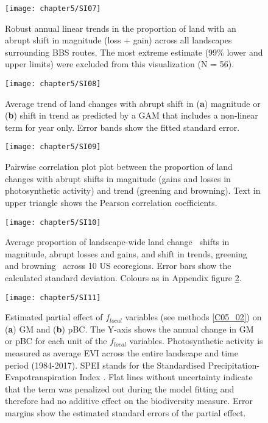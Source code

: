 \begin{figure}[htb]
\centering
\texttt{[image: chapter5/SI07]}
\caption{Robust annual linear trends in the proportion of land with an abrupt shift in magnitude (loss + gain) across all landscapes surrounding BBS routes. The most extreme estimate (99\% lower and upper limits) were excluded from this visualization (N = 56). }
\label{SI05_07}
\end{figure}

\begin{figure}[htb]
\centering
\texttt{[image: chapter5/SI08]}
\caption{Average trend of land changes with abrupt shift in (\textbf{a}) magnitude or (\textbf{b}) shift in trend as predicted by a GAM that includes a non-linear term for year only. Error bands show the fitted standard error.}
\label{SI05_08}
\end{figure}

\begin{figure}[htb]
\centering
\texttt{[image: chapter5/SI09]}
\caption{Pairwise correlation plot plot between the proportion of land changes with abrupt shifts in magnitude (gains and losses in photosynthetic activity) and trend (greening and browning). Text in upper triangle shows the Pearson correlation coefficients.}
\label{SI05_09}
\end{figure}

\begin{figure}[htb]
\centering
\texttt{[image: chapter5/SI10]}
\caption{Average proportion of landscape-wide land change \textendash\ shifts in magnitude, \eg abrupt losses and gains, and shift in trends, \eg greening and browning \textendash\ across 10 US ecoregions. Error bars show the calculated standard deviation. Colours as in Appendix figure \ref{SI05_08}.}
\label{SI05_10}
\end{figure}

\begin{figure}[htb]
\centering
\texttt{[image: chapter5/SI11]}
\caption{Estimated partial effect of $f_{local}$ variables (see methods \ref{C05_02}) on (\textbf{a}) GM and (\textbf{b}) pBC. The Y-axis shows the annual change in GM or pBC for each unit of the $f_{local}$ variables. Photosynthetic activity is measured as average EVI across the entire landscape and time period (1984-2017). SPEI stands for the Standardised Precipitation-Evapotranspiration Index \citep{Vicente-Serrano2010}. Flat lines without uncertainty indicate that the term was penalized out during the model fitting and therefore had no additive effect on the biodiversity measure. Error margins show the estimated standard errors of the partial effect.
}
\label{SI05_11}
\end{figure}